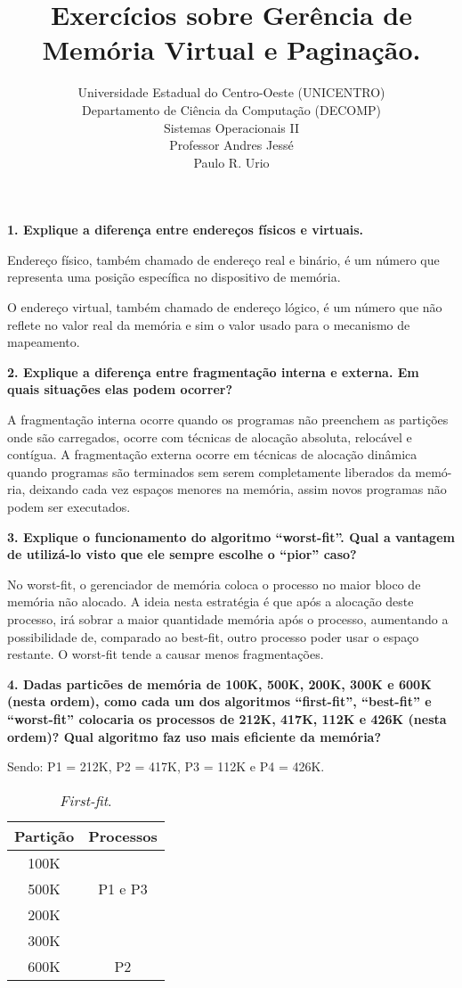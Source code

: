 \documentclass[12pt,a4paper]{article}
\title{Exercícios sobre Gerência de Memória Virtual e Paginação.}
\author{Universidade Estadual do Centro-Oeste (UNICENTRO)\\
        Departamento de Ciência da Computação (DECOMP)\\
        Sistemas Operacionais II \\
        Professor Andres Jessé \\
	Paulo R. Urio }
\newcommand{\pergunta}[1]{\noindent \textbf{#1}}
\begin{document}
\maketitle

\pergunta{1. Explique a diferença entre endereços físicos e virtuais.}

Endereço físico, também chamado de endereço real e binário, é um número
que representa uma posição específica no dispositivo de memória.

O endereço virtual, também chamado de endereço lógico,  é um número que 
não reflete no valor real da memória e sim o valor usado para o mecanismo 
de mapeamento.

\pergunta {2. Explique a diferença entre fragmentação interna e externa. Em 
quais situações elas podem ocorrer?}

A fragmentação interna ocorre quando os programas não preenchem as partições 
onde são carregados, ocorre com técnicas de alocação absoluta, relocável
e contígua. A fragmentação externa ocorre em técnicas de alocação dinâmica
quando programas são terminados sem serem completamente liberados da memó-
ria, deixando cada vez espaços menores na memória, assim novos programas não
podem ser executados.

\pergunta{3. Explique o funcionamento do algoritmo ``worst-fit''. Qual a 
vantagem de utilizá-lo visto que ele sempre escolhe o ``pior'' caso?}

No worst-fit, o gerenciador de memória coloca o processo no maior
bloco de memória não alocado. A ideia nesta estratégia é que após a alocação
deste processo, irá sobrar a maior quantidade memória após o processo, 
aumentando a possibilidade de, comparado ao best-fit, outro processo poder 
usar o espaço restante.  O worst-fit tende a causar menos fragmentações.

\pergunta{4. Dadas particões de memória de 100K, 500K, 200K, 300K e 600K (nesta 
ordem), como cada um dos algoritmos ``first-fit'', ``best-fit'' e ``worst-fit''
colocaria os processos de 212K, 417K, 112K e 426K (nesta ordem)? Qual algoritmo 
faz uso mais eficiente da memória?}

Sendo: P1 = 212K, P2 = 417K, P3 = 112K e P4 = 426K.

\begin{table}[!ht]
\begin{center}
	\begin{tabular}{| c | c |}
	\hline \textbf{Partição} & \textbf{Processos} \\ \hline
	{\ttfamily 100K} &  \\ \hline
	{\ttfamily 500K} & {\ttfamily P1 e P3} \\ \hline
	{\ttfamily 200K} & \\ \hline
	{\ttfamily 300K} & {\ttfamily } \\ \hline
	{\ttfamily 600K} & {\ttfamily P2} \\ \hline
	\end{tabular}
	\caption{\textsl{First-fit}.}
\end{center}
\end{table}
\end{document}
